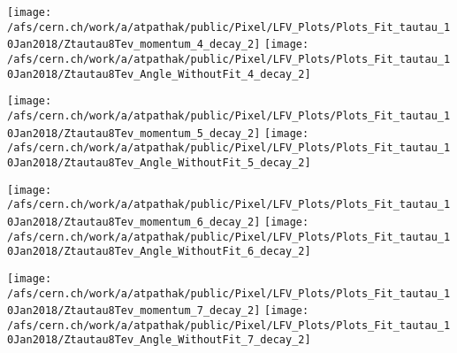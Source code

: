 \documentclass{beamer}
\begin{document}
\begin{frame}
\begin{normalsize}
\begin{center}
\texttt{[image: /afs/cern.ch/work/a/atpathak/public/Pixel/LFV\_Plots/Plots\_Fit\_tautau\_10Jan2018/Ztautau8Tev\_momentum\_4\_decay\_2]}
\texttt{[image: /afs/cern.ch/work/a/atpathak/public/Pixel/LFV\_Plots/Plots\_Fit\_tautau\_10Jan2018/Ztautau8Tev\_Angle\_WithoutFit\_4\_decay\_2]} 
\end{center}
\end{normalsize}
\end {frame}
\begin{frame}
\begin{normalsize}
\begin{center}
\texttt{[image: /afs/cern.ch/work/a/atpathak/public/Pixel/LFV\_Plots/Plots\_Fit\_tautau\_10Jan2018/Ztautau8Tev\_momentum\_5\_decay\_2]}
\texttt{[image: /afs/cern.ch/work/a/atpathak/public/Pixel/LFV\_Plots/Plots\_Fit\_tautau\_10Jan2018/Ztautau8Tev\_Angle\_WithoutFit\_5\_decay\_2]} 
\end{center}
\end{normalsize}
\end {frame}
\begin{frame}
\begin{normalsize}
\begin{center}
\texttt{[image: /afs/cern.ch/work/a/atpathak/public/Pixel/LFV\_Plots/Plots\_Fit\_tautau\_10Jan2018/Ztautau8Tev\_momentum\_6\_decay\_2]}
\texttt{[image: /afs/cern.ch/work/a/atpathak/public/Pixel/LFV\_Plots/Plots\_Fit\_tautau\_10Jan2018/Ztautau8Tev\_Angle\_WithoutFit\_6\_decay\_2]} 
\end{center}
\end{normalsize}
\end {frame}
\begin{frame}
\begin{normalsize}
\begin{center}
\texttt{[image: /afs/cern.ch/work/a/atpathak/public/Pixel/LFV\_Plots/Plots\_Fit\_tautau\_10Jan2018/Ztautau8Tev\_momentum\_7\_decay\_2]}
\texttt{[image: /afs/cern.ch/work/a/atpathak/public/Pixel/LFV\_Plots/Plots\_Fit\_tautau\_10Jan2018/Ztautau8Tev\_Angle\_WithoutFit\_7\_decay\_2]} 
\end{center}
\end{normalsize}
\end {frame}
\end{document}
